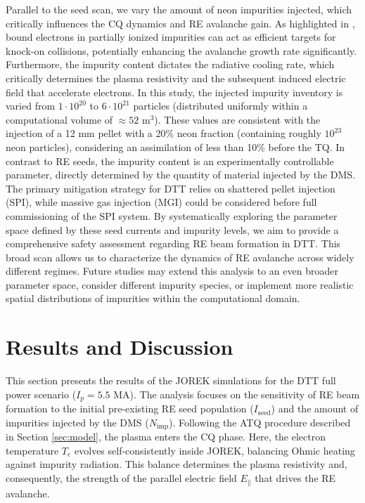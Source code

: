 \documentclass[aip,reprint]{revtex4-1}
\begin{document}
Parallel to the seed scan, we vary the amount of neon impurities injected, which critically influences the CQ dynamics and RE avalanche gain. As highlighted in \cite{Hesslow2019}, bound electrons in partially ionized impurities can act as efficient targets for knock-on collisions, potentially enhancing the avalanche growth rate significantly. Furthermore, the impurity content dictates the radiative cooling rate, which critically determines the plasma resistivity and the subsequent induced electric field that accelerate electrons. In this study, the injected impurity inventory is varied from $1 \cdot 10^{20}$ to $6 \cdot 10^{21}$ particles (distributed uniformly within a computational volume of $\approx 52$ $\text{m}^3$). These values are consistent with the injection of a 12 mm pellet with a 20\% neon fraction (containing roughly $10^{23}$ neon particles), considering an assimilation of less than 10\% before the TQ. In contrast to RE seeds, the impurity content is an experimentally controllable parameter, directly determined by the quantity of material injected by the DMS. The primary mitigation strategy for DTT relies on shattered pellet injection (SPI), while massive gas injection (MGI) could be considered before full commissioning of the SPI system. By systematically exploring the parameter space defined by these seed currents and impurity levels, we aim to provide a comprehensive safety assessment regarding RE beam formation in DTT. This broad scan allows us to characterize the dynamics of RE avalanche across widely different regimes. Future studies may extend this analysis to an even broader parameter space, consider different impurity species, or implement more realistic spatial distributions of impurities within the computational domain.



\section{Results and Discussion}
\label{sec:results}

This section presents the results of the JOREK simulations for the DTT full power scenario ($I_p = 5.5$ MA). The analysis focuses on the sensitivity of RE beam formation to the initial pre-existing RE seed population ($I_\text{seed}$) and the amount of impurities injected by the DMS ($N_\text{imp}$). Following the ATQ procedure described in Section \ref{sec:model}, the plasma enters the CQ phase. Here, the electron temperature $T_e$ evolves self-consistently inside JOREK, balancing Ohmic heating against impurity radiation. This balance determines the plasma resistivity and, consequently, the strength of the parallel electric field $E_{\parallel}$ that drives the RE avalanche.
\end{document}
